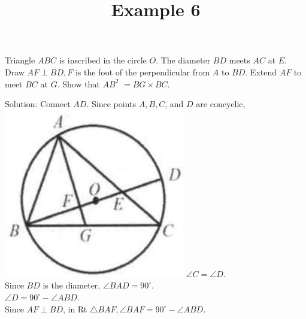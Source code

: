 \documentclass{article}
\title{Example 6}
\date{}
\begin{document}
\maketitle

Triangle \(A B C\) is inscribed in the circle \(O\). The diameter \(B D\) meets \(A C\) at \(E\). Draw \(A F \perp B D, F\) is the foot of the perpendicular from \(A\) to \(B D\). Extend \(A F\) to meet \(B C\) at \(G\). Show that \(A B^{2}\) \(=B G \times B C\).

Solution:
Connect \(A D\). Since points \(A, B, C\), and \(D\) are concyclic,\\
\includegraphics[width=\textwidth]{images/165(4).jpg} \(\angle C=\angle D\).\\
Since \(B D\) is the diameter, \(\angle B A D=90^{\circ}\).\\
\(\angle D=90^{\circ}-\angle A B D\).\\
Since \(A F \perp B D\), in Rt \(\triangle B A F, \angle B A F=90^{\circ}-\angle A B D\).\\
\centering
\end{document}
